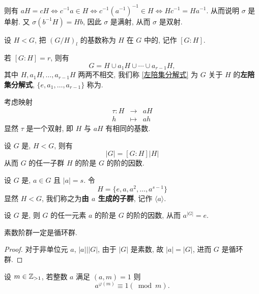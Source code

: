则有 $aH=cH\Leftrightarrow c^{-1}a\in H\Leftrightarrow c^{-1}(a^{-1})^{-1}\in H\Leftrightarrow Hc^{-1}=Ha^{-1}$. 从而说明 $\sigma$ 是单射. 又 $\sigma(b^{-1}H)=Hb$, 因此 $\sigma$ 是满射, 从而 $\sigma$ 是双射.

\begin{definition}
	\noindent 设 $H<G$, 把 $(G/H)_l$ 的基数称为 $H$ 在 $G$ 中的, 记作 $[G:H]$.
\end{definition}

若 $[G:H]=r$, 则有
\begin{equation}\label{左陪集分解式}
	G=H\cup a_1 H\cup\cdots\cup a_{r-1}H,
\end{equation}
其中 $H,a_1H,\ldots,a_{r-1}H$ 两两不相交, 我们称 \eqref{左陪集分解式} 为 $G$ 关于 $H$ 的\textbf{左陪集分解式}, $\{e,a_1,\ldots,a_{r-1}\}$ 称为.

考虑映射 $$\begin{array}{rcl}
	\tau:H &\to& aH \\
	h & \mapsto & ah
\end{array}$$ 显然 $\tau$ 是一个双射, 即 $H$ 与 $aH$ 有相同的基数.

\begin{theorem}[\t{Lagrange} 定理]
	设 $G$ 是, $H<G$, 则有 $$|G|=[G:H]|H|$$ 从而 $G$ 的任一子群 $H$ 的阶是 $G$ 的阶的因数.
\end{theorem}

\begin{definition}
	设 $G$ 是, $a\in G$ 且 $|a|=s$. 令 $$H=\{e,a,a^2,\ldots,a^{s-1}\}$$ 显然 $H<G$, 我们称之为\textbf{由 $a$ 生成的子群}, 记作 $\langle a\rangle$.
\end{definition}

\begin{corollary}
	\noindent 设 $G$ 是, 则 $G$ 的任一元素 $a$ 的阶是 $G$ 的阶的因数, 从而 $a^{|G|}=e$.
\end{corollary}

\begin{corollary}
	\noindent 素数阶群一定是循环群.
\end{corollary}
\begin{proof}
	\noindent 对于非单位元 $a$, $|a|\big| |G|$, 由于 $|G|$ 是素数, 故 $|a|=|G|$, 进而 $G$ 是循环群.
\end{proof}

\begin{theorem}[欧拉定理]
	\noindent 设 $m\in \mathbb Z_{>1}$, 若整数 $a$ 满足 $(a,m)=1$ 则 $$a^{\varphi(m)}\equiv 1 (\bmod m).$$
\end{theorem}

